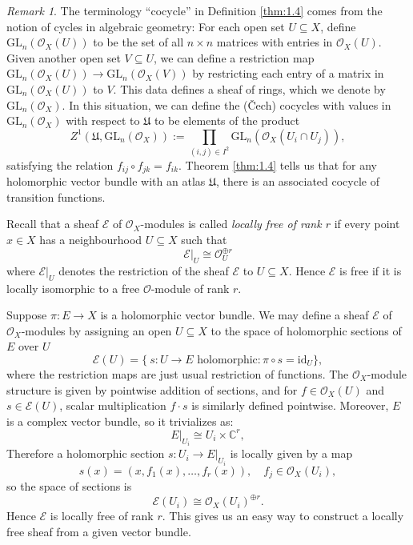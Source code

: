 \documentclass[10pt]{amsart}
\numberwithin{equation}{section}
\def\~#1{\mathscr{#1}}
\newcommand{\C}{\mathbb{C}}
\newcommand{\GL}{\mathrm{GL}}
\newcommand{\id}{\mathrm{id}}
\theoremstyle{plain}
\theoremstyle{definition}
\theoremstyle{remark}
\newtheorem*{rmk}{Remark}
\begin{document}
\begin{rmk}
The terminology ``cocycle'' in Definition \ref{thm:1.4} comes from the notion of cycles in algebraic geometry:  For each open set $U \subseteq X$, define $\GL_n \left(\~O_X(U) \right)$ to be the set of all $n \times n$ matrices with entries in $\~O_X(U)$. Given another open set $V \subseteq U$, we can define a restriction map $\GL_n \left(\~O_X(U) \right) \to \GL_n \left(\~O_X(V) \right)$ by restricting each entry of a matrix in $\GL_n(\~O_X(U))$ to $V$. This data defines a sheaf of rings, which we denote by $\GL_n \left(\~O_X \right)$. In this situation, we can define the (\v Cech) cocycles with values in $\GL_n \left(\~O_X \right)$ with respect to $\mathfrak{U}$ to be elements of the product
\[Z^1 \left(\mathfrak{U}, \GL_n \left(\~O_X \right) \right) := \prod_{(i, j) \in I^2}\GL_n \left(\~O_X(U_i \cap U_j) \right),\]
satisfying the relation $f_{ij} \circ f_{jk} = f_{ik}$. Theorem \ref{thm:1.4} tells us that for any holomorphic vector bundle with an atlas $\mathfrak{U}$, there is an associated cocycle of transition functions. 
\end{rmk}

Recall that a sheaf $\~E$ of $\~O_X$-modules is called \emph{locally free of rank $r$} if every point $x \in X$ has a neighbourhood $U \subseteq X$ such that 
\[\~E|_U \cong \~O_U^{\oplus r}\]
where $\~E|_U$ denotes the restriction of the sheaf $\~E$ to $U \subseteq X$. Hence $\~E$ is free if it is locally isomorphic to a free $\~O$-module of rank $r$. 

Suppose $\pi: E \to X$ is a holomorphic vector bundle. We may define a sheaf $\~E$ of $\~O_X$-modules by assigning an open $U \subseteq X$ to the space of holomorphic sections of $E$ over $U$
\[\~E(U) = \{\ s: U \to E \text{ holomorphic} : \pi \circ s = \id_U\},\]
where the restriction maps are just usual restriction of functions. The $\~O_X$-module structure is given by pointwise addition of sections, and for $f \in \~O_X(U)$ and $s \in \~E(U)$, scalar multiplication $f \cdot s$ is similarly defined pointwise. Moreover, $E$ is a complex vector bundle, so it trivializes as:
\[E|_{U_i} \cong U_i \times \C^r,\]
Therefore a holomorphic section $s: U_i \to E|_{U_i}$ is locally given by a map 
\[s(x) = \left(x, f_1(x), \hdots, f_r(x)\right), \quad f_j \in \~O_X(U_i),\]
so the space of sections is 
\[\~E(U_i) \cong \~O_X(U_i)^{\oplus r}.\]
Hence $\~E$ is locally free of rank $r$. This gives us an easy way to construct a locally free sheaf from a given vector bundle.
\end{document}

